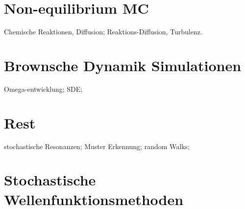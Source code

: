 \chapter{Non-equilibrium MC}
Chemische Reaktionen, Diffusion; Reaktions-Diffusion, Turbulenz.

\chapter{Brownsche Dynamik Simulationen}
Omega-entwicklung; SDE;


\chapter{Rest}
stochastische Resonanzen; Muster Erkennung; random Walks;

\chapter{Stochastische Wellenfunktionsmethoden}
